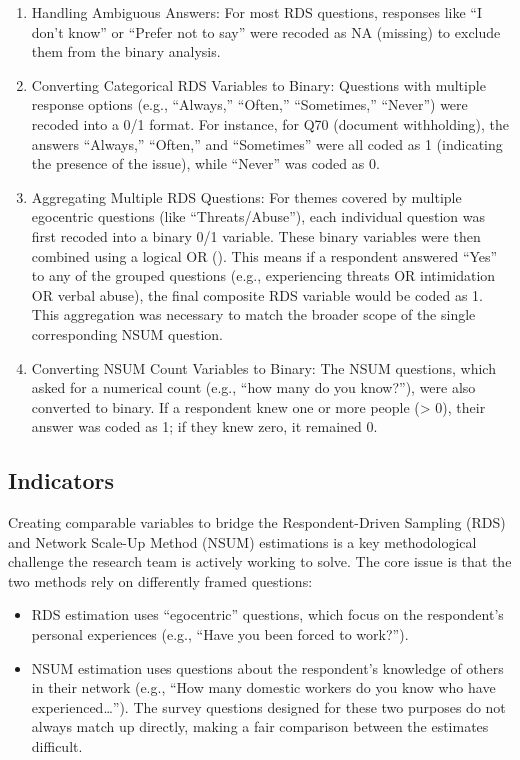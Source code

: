 \documentclass[
  12pt,
  letterpaper,
  DIV=11,
  numbers=noendperiod]{scrartcl}
\providecommand{\tightlist}{%
  \setlength{\itemsep}{0pt}\setlength{\parskip}{0pt}}
\theoremstyle{plain}
\theoremstyle{definition}
\begin{document}
\begin{enumerate}
\def\labelenumi{\arabic{enumi}.}
\tightlist
\item
  Handling Ambiguous Answers: For most RDS questions, responses like ``I
  don't know'' or ``Prefer not to say'' were recoded as NA (missing) to
  exclude them from the binary analysis.
\item
  Converting Categorical RDS Variables to Binary: Questions with
  multiple response options (e.g., ``Always,'' ``Often,'' ``Sometimes,''
  ``Never'') were recoded into a 0/1 format. For instance, for Q70
  (document withholding), the answers ``Always,'' ``Often,'' and
  ``Sometimes'' were all coded as 1 (indicating the presence of the
  issue), while ``Never'' was coded as 0.
\item
  Aggregating Multiple RDS Questions: For themes covered by multiple
  egocentric questions (like ``Threats/Abuse''), each individual
  question was first recoded into a binary 0/1 variable. These binary
  variables were then combined using a logical OR (\textbar). This means
  if a respondent answered ``Yes'' to any of the grouped questions
  (e.g., experiencing threats OR intimidation OR verbal abuse), the
  final composite RDS variable would be coded as 1. This aggregation was
  necessary to match the broader scope of the single corresponding NSUM
  question.
\item
  Converting NSUM Count Variables to Binary: The NSUM questions, which
  asked for a numerical count (e.g., ``how many do you know?''), were
  also converted to binary. If a respondent knew one or more people
  (\textgreater{} 0), their answer was coded as 1; if they knew zero, it
  remained 0.
\end{enumerate}

\subsection{Indicators}\label{indicators}

Creating comparable variables to bridge the Respondent-Driven Sampling
(RDS) and Network Scale-Up Method (NSUM) estimations is a key
methodological challenge the research team is actively working to solve.
The core issue is that the two methods rely on differently framed
questions:

\begin{itemize}
\tightlist
\item
  RDS estimation uses ``egocentric'' questions, which focus on the
  respondent's personal experiences (e.g., ``Have you been forced to
  work?'').
\item
  NSUM estimation uses questions about the respondent's knowledge of
  others in their network (e.g., ``How many domestic workers do you know
  who have experienced\ldots{}''). The survey questions designed for
  these two purposes do not always match up directly, making a fair
  comparison between the estimates difficult.
\end{itemize}
\end{document}
